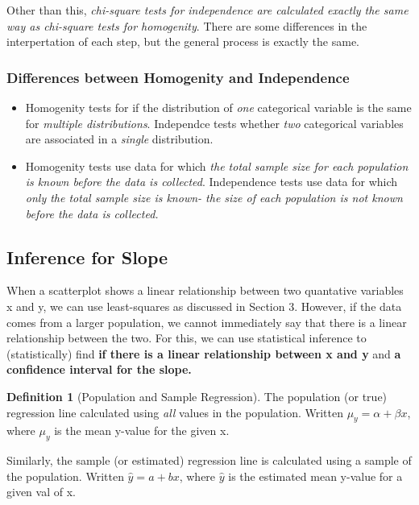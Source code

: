\documentclass[12pt, a4paper]{article}
\theoremstyle{definition}
\newtheorem{definition}{Definition}
\begin{document}
Other than this, \textit{chi-square tests for independence are calculated exactly the same way as chi-square tests for homogenity}.
There are some differences in the interpertation of each step, but the general process is exactly the same.

\subsubsection{Differences between Homogenity and Independence}
\begin{itemize}
    \item Homogenity tests for if the distribution of \textit{one} categorical variable is the same for \textit{multiple distributions}. Independce tests whether \textit{two} categorical variables are associated in a \textit{single} distribution.
    \item Homogenity tests use data for which \textit{the total sample size for each population is known before the data is collected}. Independence tests use data for which \textit{only the total sample size is known- the size of each population is not known before the data is collected.}
\end{itemize}

\subsection{Inference for Slope}
When a scatterplot shows a linear relationship between two quantative variables x and y, we can use least-squares as discussed in Section 3.
However, if the data comes from a larger population, we cannot immediately say that there is a linear relationship between the two.
For this, we can use statistical inference to (statistically) find \textbf{if there is a linear relationship between x and y} and \textbf{a confidence interval for the slope.}

\begin{definition}[Population and Sample Regression]

    The population (or true) regression line calculated using \textit{all} values in the population.
    Written $\mu_y = \alpha + \beta x$, where $\mu_y$ is the mean y-value for the given x.

    Similarly, the sample (or estimated) regression line is calculated using a sample of the population.
    Written $\hat{y} = a + bx$, where $\hat{y}$ is the estimated mean y-value for a given val of x.
\end{definition}
\end{document}
